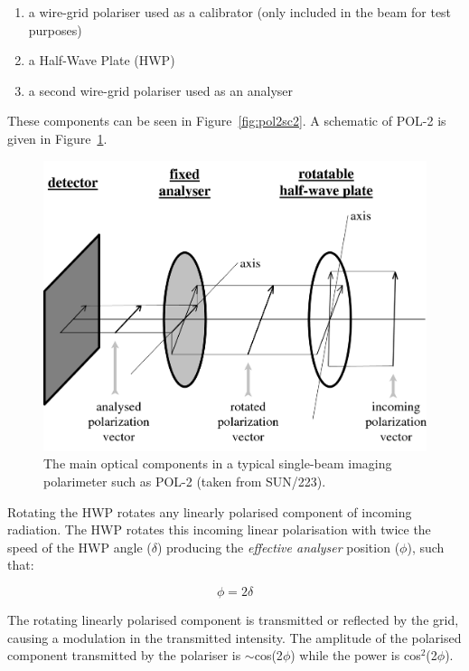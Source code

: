 \begin{enumerate}
\item a wire-grid polariser used as a calibrator (only included in the
  beam for test purposes)
\item a Half-Wave Plate (HWP)
\item a second wire-grid polariser used as an analyser
\end{enumerate}

These components can be seen in Figure~\ref{fig:pol2sc2}.  A schematic
of POL-2 is given in Figure~\ref{fig:pol2sc2diagram}.

\begin{figure}[t!]
\begin{center}
\includegraphics[width=0.8\linewidth]{singopt.png}
\caption [POL-2 optical components]{ The main optical components in a
  typical single-beam imaging polarimeter such as POL-2 (taken from
  SUN/223).}
\label{fig:pol2sc2diagram}
\end{center}
\end{figure}

Rotating the HWP rotates any linearly polarised component of incoming
radiation. The HWP rotates this incoming linear polarisation with
twice the speed of the HWP angle ($\delta$) producing the
\emph{effective analyser} position ($\phi$), such that:


\begin{equation}
\phi = 2 \delta
\end{equation}


The rotating linearly polarised component is transmitted or reflected
by the grid, causing a modulation in the transmitted intensity.
The amplitude of the polarised component transmitted by the polariser is
$\sim$cos(2$\phi$) while the power is cos$^{2}$(2$\phi$).


